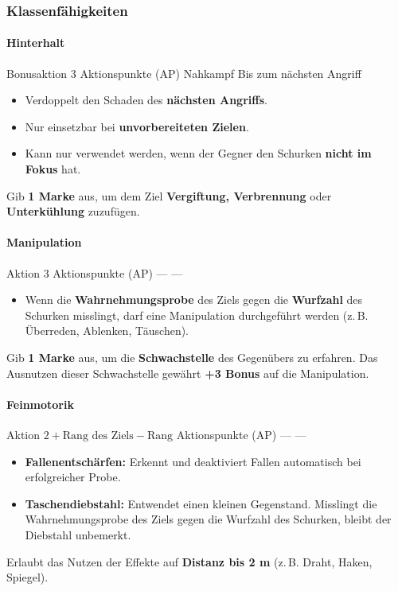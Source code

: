 \subsubsection*{Klassenfähigkeiten}

\paragraph*{Hinterhalt}
\skillcard
{}
{Bonusaktion}
{3 Aktionspunkte (AP)}
{Nahkampf}
{Bis zum nächsten Angriff}
{
	\begin{itemize}
		\item Verdoppelt den Schaden des \textbf{nächsten Angriffs}.
		\item Nur einsetzbar bei \textbf{unvorbereiteten Zielen}.
		\item Kann nur verwendet werden, wenn der Gegner den Schurken
		\textbf{nicht im Fokus} hat.
	\end{itemize}
}
{
	Gib \textbf{1 Marke} aus, um dem Ziel \textbf{Vergiftung, Verbrennung}
	oder \textbf{Unterkühlung} zuzufügen.
}

\paragraph*{Manipulation}
\skillcard
{}
{Aktion}
{3 Aktionspunkte (AP)}
{—}
{—}
{
	\begin{itemize}
		\item Wenn die \textbf{Wahrnehmungsprobe} des Ziels gegen die
		\textbf{Wurfzahl} des Schurken misslingt, darf eine Manipulation
		durchgeführt werden (z.\,B. Überreden, Ablenken, Täuschen).
	\end{itemize}
}
{
	Gib \textbf{1 Marke} aus, um die \textbf{Schwachstelle} des Gegenübers
	zu erfahren. Das Ausnutzen dieser Schwachstelle gewährt
	\textbf{+3 Bonus} auf die Manipulation.
}

\paragraph*{Feinmotorik}
\skillcard
{}
{Aktion}
{$2 + \text{Rang des Ziels} - \text{Rang}$ Aktionspunkte (AP)}
{—}
{—}
{
	\begin{itemize}
		\item \textbf{Fallenentschärfen:} Erkennt und deaktiviert Fallen
		automatisch bei erfolgreicher Probe.
		\item \textbf{Taschendiebstahl:} Entwendet einen kleinen Gegenstand.
		Misslingt die Wahrnehmungsprobe des Ziels gegen die Wurfzahl des
		Schurken, bleibt der Diebstahl unbemerkt.
	\end{itemize}
}
{
	Erlaubt das Nutzen der Effekte auf \textbf{Distanz bis 2 m}
	(z.\,B. Draht, Haken, Spiegel).
}

